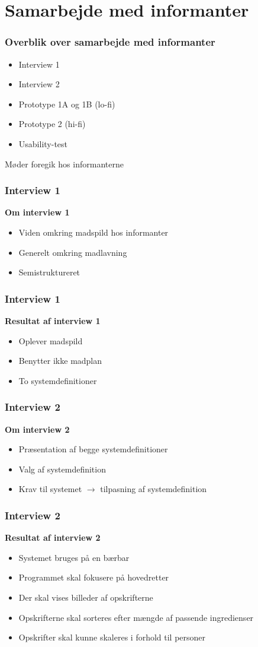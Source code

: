 \section{Samarbejde med informanter}

\begin{frame}
\frametitle{Overblik over samarbejde med informanter}
	\begin{itemize}	
		\item Interview 1
		\item Interview 2
		\item Prototype 1A og 1B (lo-fi)
		\item Prototype 2 (hi-fi)
		\item Usability-test
	\end{itemize}
		Møder foregik hos informanterne
\end{frame}

\begin{frame}
\frametitle{Interview 1}
	\textbf{Om interview 1}
		\begin{itemize}
		\item Viden omkring madspild hos informanter
		\item Generelt omkring madlavning
		\item Semistruktureret
		\end{itemize}
\end{frame}

\begin{frame}
\frametitle{Interview 1}
	\textbf{Resultat af interview 1}
		\begin{itemize}
			\item Oplever madspild
			\item Benytter ikke madplan
			\item To systemdefinitioner
		\end{itemize}	
\end{frame}

\begin{frame}
\frametitle{Interview 2}
	\textbf{Om interview 2}
		\begin{itemize}
		\item Præsentation af begge systemdefinitioner
		\item Valg af systemdefinition
		\item Krav til systemet $\rightarrow$ tilpasning af systemdefinition
	\end{itemize}
\end{frame}

\begin{frame}
\frametitle{Interview 2}
	\textbf{Resultat af interview 2}
		\begin{itemize}
		\item Systemet bruges på en bærbar
		\item Programmet skal fokusere på hovedretter
		\item Der skal vises billeder af opskrifterne
		\item Opskrifterne skal sorteres efter mængde af passende ingredienser
		\item Opskrifter skal kunne skaleres i forhold til personer
	\end{itemize}
\end{frame}

